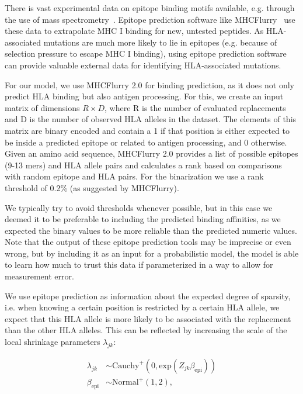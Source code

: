 \documentclass{bioinfo}
\begin{document}
\begin{methods}
There is vast experimental data on epitope binding motifs available, e.g. through the use of mass spectrometry~\citep{Hunt1992}. Epitope prediction software like MHCFlurry~\citep{ODonnell2020} use these data to extrapolate MHC I binding for new, untested peptides.
As HLA-associated mutations are much more likely to lie in epitopes (e.g. because of selection pressure to escape MHC I binding), using epitope prediction software can provide valuable external data for identifying HLA-associated mutations.

For our model, we use MHCFlurry 2.0 for binding prediction, as it does not only predict HLA binding but also antigen processing. For this, we create an input matrix of dimensions \(R\times D\), where R is the number of evaluated replacements and D is the number of observed HLA alleles in the dataset. The elements of this matrix are binary encoded and contain a 1 if that position is either expected to be inside a predicted epitope or related to antigen processing, and 0 otherwise. Given an amino acid sequence, MHCFlurry 2.0 provides a list of possible epitopes (9-13 mers) and HLA allele pairs and calculates a rank based on comparisons with random epitope and HLA pairs. For the binarization we use a rank threshold of 0.2\% (as suggested by MHCFlurry).

We typically try to avoid thresholds whenever possible, but in this case we deemed it to be preferable to including the predicted binding affinities, as we expected the binary values to be more reliable than the predicted numeric values.
Note that the output of these epitope prediction tools may be imprecise or even wrong, but by including it as an input for a probabilistic model, the model is able to learn how much to trust this data if parameterized in a way to allow for measurement error.

We use epitope prediction as information about the expected degree of sparsity, i.e. when knowing a certain position is restricted by a certain HLA allele, we expect that this HLA allele is more likely to be associated with the replacement than the other HLA alleles.
This can be reflected by increasing the scale of the local shrinkage parameters \(\lambda_{jk}\):

\begin{equation}
  \begin{aligned}
    \lambda_{jk} &\sim \text{Cauchy}^{+}(0, \text{exp}(Z_{jk}\beta_{\text{epi}})) \\
    \beta_{\text{epi}} &\sim \text{Normal}^{+}(1, 2),
  \end{aligned}
\end{equation}
 

\end{methods}
\end{document}
